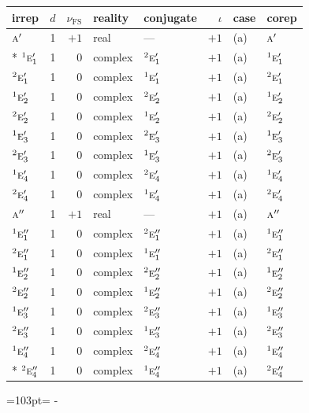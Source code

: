 \documentclass[10pt,a4paper]{article}
\newcommand{\needspace}[1]{\par\penalty-100\begingroup\dimen0=#1\relax\dimen2=\pagegoal
  \advance\dimen2-\pagetotal\ifdim\dimen0>\dimen2\relax\ifdim\dimen2>0pt\vfil\break\fi\fi
  \endgroup}
\numberwithin{equation}{section}
\newcommand{\irr}[1]{\text{\normalfont\scshape #1}}
\newcommand{\conjpair}[1]{{}^{#1}}
\newcommand{\fsind}{\nu_{\mathrm{FS}}}
\begin{document}
{\small\renewcommand{\arraystretch}{1.25}\setlength{\tabcolsep}{4pt}\begin{longtable}{@{}lrrllrll@{}}\toprule
irrep & $d$ & $\fsind$ & reality & conjugate & $\iota$ & case & corep\\\midrule\endhead
\bottomrule\endfoot\endlastfoot
$\irr{a}'$ & 1 & $+1$ & real & --- & $+1$ & (a) & $\irr{a}'$\\*
$\conjpair{1}\irr{e}_{1}'$ & 1 & $0$ & complex & $\conjpair{2}\irr{e}_{1}'$ & $+1$ & (a) & $\conjpair{1}\irr{e}_{1}'$\\
$\conjpair{2}\irr{e}_{1}'$ & 1 & $0$ & complex & $\conjpair{1}\irr{e}_{1}'$ & $+1$ & (a) & $\conjpair{2}\irr{e}_{1}'$\\
$\conjpair{1}\irr{e}_{2}'$ & 1 & $0$ & complex & $\conjpair{2}\irr{e}_{2}'$ & $+1$ & (a) & $\conjpair{1}\irr{e}_{2}'$\\
$\conjpair{2}\irr{e}_{2}'$ & 1 & $0$ & complex & $\conjpair{1}\irr{e}_{2}'$ & $+1$ & (a) & $\conjpair{2}\irr{e}_{2}'$\\
$\conjpair{1}\irr{e}_{3}'$ & 1 & $0$ & complex & $\conjpair{2}\irr{e}_{3}'$ & $+1$ & (a) & $\conjpair{1}\irr{e}_{3}'$\\
$\conjpair{2}\irr{e}_{3}'$ & 1 & $0$ & complex & $\conjpair{1}\irr{e}_{3}'$ & $+1$ & (a) & $\conjpair{2}\irr{e}_{3}'$\\
$\conjpair{1}\irr{e}_{4}'$ & 1 & $0$ & complex & $\conjpair{2}\irr{e}_{4}'$ & $+1$ & (a) & $\conjpair{1}\irr{e}_{4}'$\\
$\conjpair{2}\irr{e}_{4}'$ & 1 & $0$ & complex & $\conjpair{1}\irr{e}_{4}'$ & $+1$ & (a) & $\conjpair{2}\irr{e}_{4}'$\\
$\irr{a}''$ & 1 & $+1$ & real & --- & $+1$ & (a) & $\irr{a}''$\\
$\conjpair{1}\irr{e}_{1}''$ & 1 & $0$ & complex & $\conjpair{2}\irr{e}_{1}''$ & $+1$ & (a) & $\conjpair{1}\irr{e}_{1}''$\\
$\conjpair{2}\irr{e}_{1}''$ & 1 & $0$ & complex & $\conjpair{1}\irr{e}_{1}''$ & $+1$ & (a) & $\conjpair{2}\irr{e}_{1}''$\\
$\conjpair{1}\irr{e}_{2}''$ & 1 & $0$ & complex & $\conjpair{2}\irr{e}_{2}''$ & $+1$ & (a) & $\conjpair{1}\irr{e}_{2}''$\\
$\conjpair{2}\irr{e}_{2}''$ & 1 & $0$ & complex & $\conjpair{1}\irr{e}_{2}''$ & $+1$ & (a) & $\conjpair{2}\irr{e}_{2}''$\\
$\conjpair{1}\irr{e}_{3}''$ & 1 & $0$ & complex & $\conjpair{2}\irr{e}_{3}''$ & $+1$ & (a) & $\conjpair{1}\irr{e}_{3}''$\\
$\conjpair{2}\irr{e}_{3}''$ & 1 & $0$ & complex & $\conjpair{1}\irr{e}_{3}''$ & $+1$ & (a) & $\conjpair{2}\irr{e}_{3}''$\\
$\conjpair{1}\irr{e}_{4}''$ & 1 & $0$ & complex & $\conjpair{2}\irr{e}_{4}''$ & $+1$ & (a) & $\conjpair{1}\irr{e}_{4}''$\\*
$\conjpair{2}\irr{e}_{4}''$ & 1 & $0$ & complex & $\conjpair{1}\irr{e}_{4}''$ & $+1$ & (a) & $\conjpair{2}\irr{e}_{4}''$\\
\bottomrule\end{longtable}}
\needspace{103pt}
\end{document}
